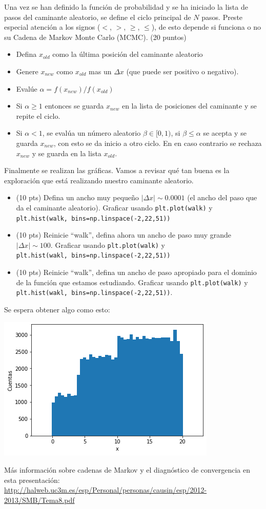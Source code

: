 \documentclass{article}
\begin{document}
Una vez se han definido la función de probabilidad y se ha iniciado la lista de pasos del
caminante aleatorio, se define el ciclo principal de $N$ pasos. Preste especial atención a
los signos ($<$, $>$, $\geq$, $\leq$), de esto depende si funciona o no su Cadena de Markov
Monte Carlo (MCMC). (20 puntos)
\begin{itemize}
\item Defina $x_{old}$ como la última posición del caminante aleatorio
\item Genere $x_{new}$ como $x_{old}$ mas un $\Delta x$ (que puede ser positivo o negativo).
\item Evalúe $\alpha = f(x_{new}) / f(x_{old})$
\item Si $\alpha \geq 1$ entonces se guarda $x_{new}$ en la lista de posiciones del caminante y se repite el ciclo.
\item Si $\alpha<1$, se evalúa un número aleatorio $\beta \in [0,1)$, si $\beta \leq \alpha$ se acepta y se guarda
  $x_{new}$, con esto se da inicio a otro ciclo. En en caso contrario se rechaza $x_{new}$ y se guarda en la lista $x_{old}$.
\end{itemize}


Finalmente se realizan las gráficas. Vamos a revisar qué tan buena es la exploración que está realizando
nuestro caminante aleatorio.

\begin{itemize}
\item (10 pts) Defina un ancho muy pequeño $|\Delta x|  \sim 0.0001$ (el ancho del paso que da el caminante
  aleatorio). Graficar usando \texttt{plt.plot(walk)} y
  \texttt{plt.hist(walk, bins=np.linspace(-2,22,51))}
\item (10 pts) Reinicie ``walk'', defina ahora un ancho de paso muy grande $|\Delta x| \sim 100$.
  Graficar usando \texttt{plt.plot(walk)} y \\ \texttt{plt.hist(wakl, bins=np.linspace(-2,22,51))}
\item (10 pts) Reinicie ``walk'', defina un ancho de paso apropiado para el dominio de la función que estamos
  estudiando. Graficar usando \texttt{plt.plot(walk)} y \texttt{plt.hist(wakl, bins=np.linspace(-2,22,51))}.
\end{itemize}

Se espera obtener algo como esto:

\includegraphics{hw12_hist.png}

Más información sobre cadenas de Markov y el diagnóstico de convergencia en esta presentación:
\url{http://halweb.uc3m.es/esp/Personal/personas/causin/esp/2012-2013/SMB/Tema8.pdf}
\end{document}
